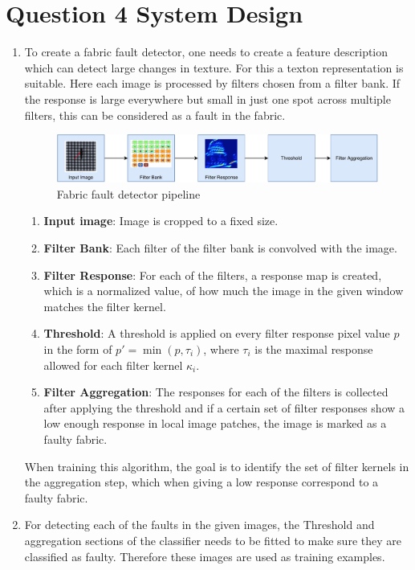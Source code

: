 \documentclass[12pt,letterpaper]{article}
\begin{document}
\section*{Question 4 System Design}
\begin{enumerate}[label=(\alph*)]
	\item To create a fabric fault detector, one needs to create a feature description which
	      can detect large changes in texture. For this a texton representation is suitable.
	      Here each image is processed by filters chosen from a filter bank. If the response
	      is large everywhere but small in just one spot across multiple
	      filters, this can be considered as a fault in the fabric.
	      
	      \begin{figure}[h!]
	      	\includegraphics[width=\linewidth]{fig/filters.pdf}
	      	\caption{Fabric fault detector pipeline}
	      \end{figure}
	          
	      \begin{enumerate}
	      	\item \textbf{Input image}: Image is cropped to a fixed size.
	      	\item \textbf{Filter Bank}: Each filter of the filter bank is convolved with the image.
	      	\item \textbf{Filter Response}: For each of the filters, a response map is created, which is
	      	      a normalized value, of how much the image in the given window matches the filter kernel.
	      	\item \textbf{Threshold}: A threshold is applied on every filter response pixel value \( p \)
	      	      in the form of \( p' = \min(p, \tau_i) \), where \( \tau_i \) is the maximal response allowed for each filter kernel \( \kappa_i \).
	      	\item \textbf{Filter Aggregation}: The responses for each of the filters is collected 
	      	      after applying the threshold and if a certain set of filter responses show a low enough
	      	      response in local image patches, the image is marked as a faulty fabric.
	      \end{enumerate}
	      
	      When training this algorithm, the goal is to identify the set of filter kernels
	      in the aggregation step, which when giving a low response correspond to a faulty fabric.
	      
	\item For detecting each of the faults in the given images, 
	      the Threshold and aggregation sections of the classifier needs to be fitted to
	      make sure they are classified as faulty. Therefore these images are used as training examples.
\end{enumerate}
\end{document}
